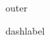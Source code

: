 \documentclass{article}
\begin{document}
\begin{list}{}{}
\item outer
\begin{compactitem}[--]
\item dashlabel
\end{compactitem}
\end{list}
\end{document}
